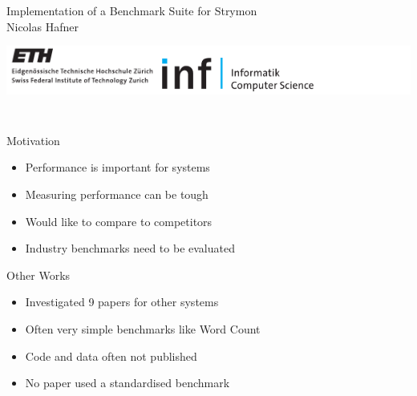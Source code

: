 \documentclass[14pt,t]{beamer}
\renewcommand{\title}[1]{
  {\huge #1} \vskip 0.4cm
}
\begin{document}
\begin{frame}
  \begin{center}
    \vspace{2cm}
    {\LARGE Implementation of a Benchmark Suite for Strymon} \\
    \vspace{0.5cm}
    Nicolas Hafner \\
    \vspace*{2.9cm}
    \hspace*{-1cm}\colorbox{white}{\begin{minipage}{\pagewidth}
        \begin{center}
          \includegraphics[width=5cm]{../systems-cover/ethlogo_black.pdf}
          \hspace{1cm}
          \includegraphics[width=5cm]{../systems-cover/inf-logo.pdf}
        \end{center}
      \end{minipage}} \\
  \end{center}
\end{frame}

\begin{frame}
  \title{Motivation}
  \begin{itemize}
  \item Performance is important for systems
  \item Measuring performance can be tough
  \item Would like to compare to competitors
  \item Industry benchmarks need to be evaluated
  \end{itemize}
\end{frame}

\begin{frame}
  \title{Other Works}
  \begin{itemize}
  \item Investigated 9 papers for other systems
  \item Often very simple benchmarks like Word Count
  \item Code and data often not published
  \item No paper used a standardised benchmark
  \end{itemize}
\end{frame}
\end{document}
